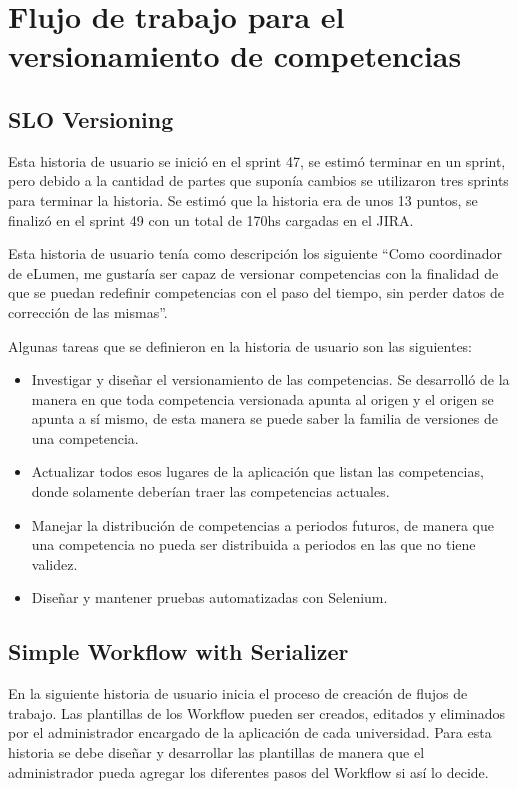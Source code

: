\section{Flujo de trabajo para el versionamiento de competencias}
\subsection{SLO Versioning}
Esta historia de usuario se inició en el sprint 47, se estimó terminar en un sprint, pero debido a la cantidad de partes que suponía cambios se utilizaron tres sprints para terminar la historia. Se estimó que la historia era de unos 13 puntos, se finalizó en el sprint 49 con un total de 170hs cargadas en el JIRA.

Esta historia de usuario tenía como descripción los siguiente “Como coordinador de eLumen, me gustaría ser capaz de versionar competencias con la finalidad de que se puedan redefinir competencias con el paso del tiempo, sin perder datos de corrección de las mismas”.

Algunas tareas que se definieron en la historia de usuario son las siguientes:
\begin{itemize}
	\item Investigar y diseñar el versionamiento de las competencias. Se desarrolló de la manera en que toda competencia versionada apunta al origen y el origen se apunta a sí mismo, de esta manera se puede saber la familia de versiones de una competencia.
	\item Actualizar todos esos lugares de la aplicación que listan las competencias, donde solamente deberían traer las competencias actuales.
	\item Manejar la distribución de competencias a periodos futuros, de manera que una competencia no pueda ser distribuida a periodos en las que no tiene validez.
	\item Diseñar y mantener pruebas automatizadas con Selenium.
\end{itemize}

\subsection{Simple Workflow with Serializer}
En la siguiente historia de usuario inicia el proceso de creación de flujos de trabajo. Las plantillas de los Workflow pueden ser creados, editados y eliminados por el administrador encargado de la aplicación de cada universidad. Para esta historia se debe diseñar y desarrollar las plantillas de manera que el administrador pueda agregar los diferentes pasos del Workflow si así lo decide.


